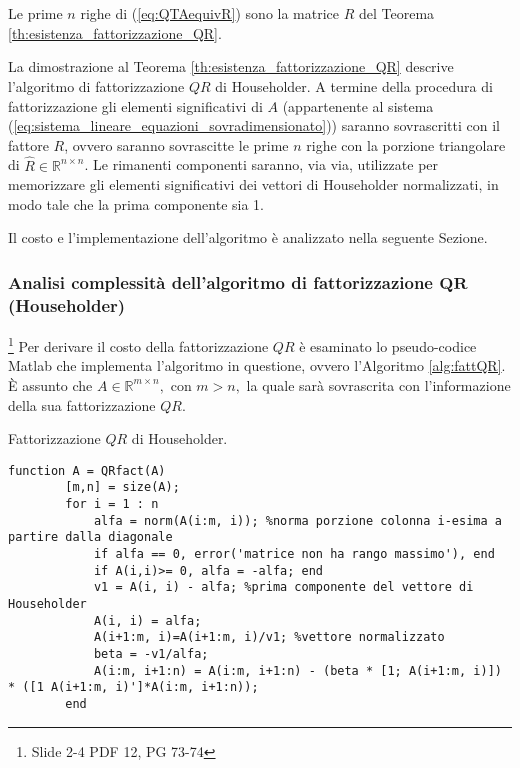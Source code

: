 \begin{remark}
    Le prime $n$ righe di (\ref{eq:QTAequivR}) sono la matrice $\widehat R$ del Teorema \ref{th:esistenza_fattorizzazione_QR}.
\end{remark}

La dimostrazione al Teorema \ref{th:esistenza_fattorizzazione_QR} descrive l'algoritmo di fattorizzazione $QR$ di Householder. A termine della procedura di fattorizzazione gli elementi significativi di $A$ (appartenente al sistema (\ref{eq:sistema_lineare_equazioni_sovradimensionato})) saranno sovrascritti con il fattore $R$, ovvero saranno sovrascitte le prime $n$ righe con la porzione triangolare di $\widehat R\in \mathbb R^{n\times n}$. Le rimanenti componenti saranno, via via, utilizzate per memorizzare gli elementi significativi dei vettori di Householder normalizzati, in modo tale che la prima componente sia 1.

Il costo e l'implementazione dell'algoritmo è analizzato nella seguente Sezione.

\subsubsection{Analisi complessità dell'algoritmo di fattorizzazione \texorpdfstring{$\boldsymbol{QR}$}{QR} (Householder)}\label{sssec:complHH}\footnote{Slide 2-4 PDF 12, PG 73-74}
Per derivare il costo della fattorizzazione $QR$ è esaminato lo pseudo-codice Matlab che implementa l'algoritmo in questione, ovvero l'Algoritmo \ref{alg:fattQR}. È assunto che $A\in\mathbb R^{m\times n},$ con $m>n,$ la quale sarà sovrascrita con l'informazione della sua fattorizzazione $QR.$

\begin{algorithm}
\caption{Fattorizzazione $QR$ di Householder.}
\label{alg:fattQR}
    \begin{lstlisting}[style=Matlab-editor]
        function A = QRfact(A)
        [m,n] = size(A);
        for i = 1 : n
            alfa = norm(A(i:m, i)); %norma porzione colonna i-esima a partire dalla diagonale
            if alfa == 0, error('matrice non ha rango massimo'), end
            if A(i,i)>= 0, alfa = -alfa; end
            v1 = A(i, i) - alfa; %prima componente del vettore di Householder
            A(i, i) = alfa;
            A(i+1:m, i)=A(i+1:m, i)/v1; %vettore normalizzato
            beta = -v1/alfa;
            A(i:m, i+1:n) = A(i:m, i+1:n) - (beta * [1; A(i+1:m, i)]) * ([1 A(i+1:m, i)']*A(i:m, i+1:n));
        end
    \end{lstlisting}
\end{algorithm}

